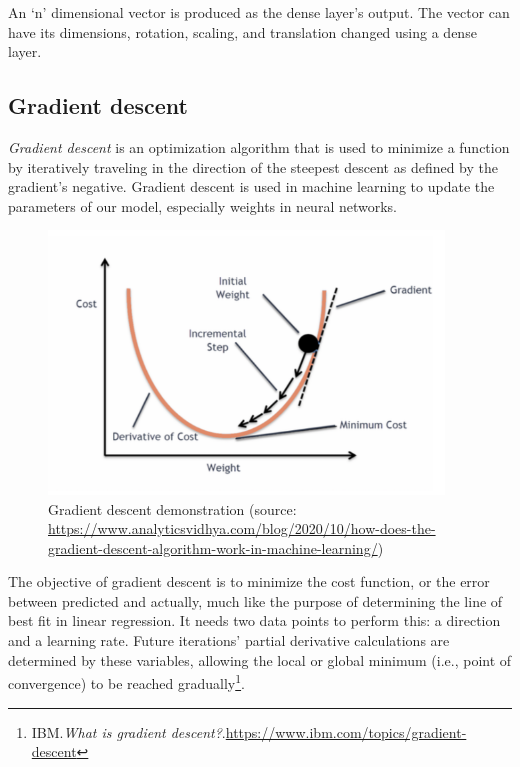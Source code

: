 An `n' dimensional vector is produced as the dense layer's output. The vector can have its dimensions, rotation, scaling, and translation changed using a dense layer. 

\newpage
\subsection{Gradient descent}
\label{subsec:gradient_descent}
\hspace{0.5cm}\emph{Gradient descent} is an optimization algorithm that is used to minimize a function by iteratively traveling in the direction of the steepest descent as defined by the gradient's negative. Gradient descent is used in machine learning to update the parameters of our model, especially weights in neural networks.
\begin{figure}[!h]
	\centering
	\includegraphics[width=\linewidth, height=7cm,keepaspectratio]{figures/gradient descent.png}
   \caption{Gradient descent demonstration (source: \url{https://www.analyticsvidhya.com/blog/2020/10/how-does-the-gradient-descent-algorithm-work-in-machine-learning/})}
\end{figure}

The objective of gradient descent is to minimize the cost function, or the error between predicted and actually, much like the purpose of determining the line of best fit in linear regression. It needs two data points to perform this: a direction and a learning rate. Future iterations' partial derivative calculations are determined by these variables, allowing the local or global minimum (i.e., point of convergence) to be reached gradually\footnote{IBM.\textit{What is gradient descent?}.\url{https://www.ibm.com/topics/gradient-descent}}.
